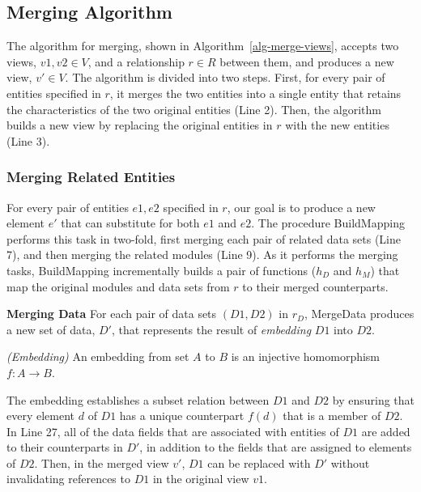 \subsection{Merging Algorithm}

The algorithm for merging, shown in Algorithm~\ref{alg-merge-views},
accepts two views, $v1, v2 \in V$, and a relationship $r \in R$
between them, and produces a new view, $v' \in V$. The algorithm is
divided into two steps. First, for every pair of entities specified in
$r$, it merges the two entities into a single entity that retains the
characteristics of the two original entities (Line 2). Then, the
algorithm builds a new view by replacing the original entities in
$r$ with the new entities (Line 3).


\subsubsection{Merging Related Entities}

For every pair of entities $e1, e2$ specified in $r$, our goal is to
produce a new element $e'$ that can substitute for both $e1$ and
$e2$. The procedure \textsf{BuildMapping} performs this task in
two-fold, first merging each pair of related data sets (Line 7), and
then merging the related modules (Line 9). As it performs the merging tasks,
\textsf{BuildMapping} incrementally builds a pair of functions ($h_{D}$ and
$h_{M}$) that map the original modules and data sets from $r$ to their
merged counterparts.


\textbf{Merging Data} For each pair of data sets $(D1, D2)$ in
$r_{D}$, \textsf{MergeData} produces a new set of data, $D'$,
that represents the result of \textit{embedding} $D1$ into
$D2$. 
\begin{defn} \emph{(Embedding)}
  An embedding from set $A$ to $B$ is an injective homomorphism $f : A
  \rightarrow B$.
\end{defn}
The embedding establishes a subset relation between $D1$ and $D2$ by
ensuring that every element $d$ of $D1$ has a unique counterpart
$f(d)$ that is a member of $D2$. In Line 27, all of the data fields
that are associated with entities of $D1$ are added to their
counterparts in $D'$, in addition to the fields that are assigned to
elements of $D2$. Then, in the merged view $v'$, $D1$ can be replaced
with $D'$ without invalidating references to $D1$ in the original view
$v1$.


